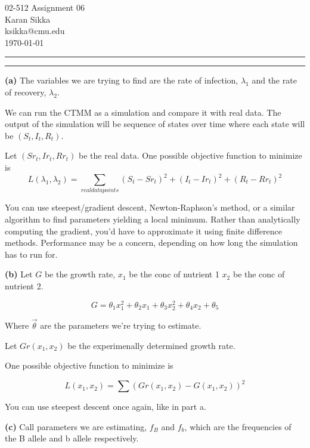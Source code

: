 \documentclass[11pt,letterpaper]{article}
\makeatletter
\newcommand{\question}[1] {\vspace{.25in} \hrule\vspace{0.5em}
\noindent{\bf #1} \vspace{0.5em}
\hrule \vspace{.10in}}
\renewcommand{\part}[1] {\vspace{.10in} {\bf (#1)}}
\newcommand{\myname}{Karan Sikka}
\newcommand{\myandrew}{ksikka@cmu.edu}
\newcommand{\myhwnum}{06}
\makeatother
\begin{document}
\medskip

\thispagestyle{plain}
\begin{center}                  %
{\Large 02-512 Assignment \myhwnum} \\
\myname \\
\myandrew \\
\today
\end{center}

\question{1}
\part{a}
The variables we are trying to find are 
the rate of infection, $\lambda_1$
and the rate of recovery, $\lambda_2$.

We can run the CTMM as a simulation
and compare it with real data.
The output of the simulation will be sequence of states over time
where each state will be $(S_t,I_t,R_t)$.

Let $(Sr_t, Ir_t, Rr_t)$ be the real data.
One possible objective function to minimize is 
$$ L(\lambda_1, \lambda_2) = \sum_{real data points} (S_t - Sr_t)^2 + (I_t - Ir_t)^2 + (R_t - Rr_t)^2 $$

You can use steepest/gradient descent, Newton-Raphson's method, or a similar algorithm to find parameters yielding a local minimum.
Rather than analytically computing the gradient, you'd have to approximate it using finite difference methods.
Performance may be a concern, depending on how long the simulation has to run for.

\part{b}
Let $G$ be the growth rate,
$x_1$ be the conc of nutrient 1
$x_2$ be the conc of nutrient 2.

$$G = \theta_1 x_1^2 + \theta_2 x_1 + \theta_3 x_2^2 + \theta_4 x_2 + \theta_5$$

Where $\vec{\theta}$ are the parameters we're trying to estimate.

Let $Gr(x_1,x_2)$ be the experimenally determined growth rate.

One possible objective function to minimize is

$$L(x_1, x_2) = \sum (Gr(x_1, x_2) - G(x_1, x_2))^2 $$

You can use steepest descent once again, like in part a.

\part{c}
Call parameters we are estimating, $f_B$ and $f_b$, which are the frequencies of the B allele and b allele respectively.
\end{document}
